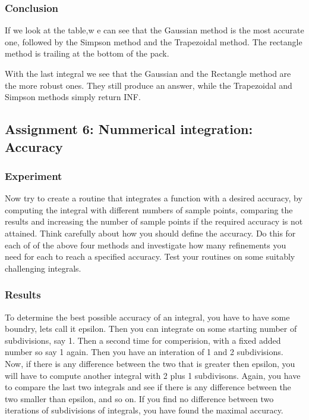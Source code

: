 \documentclass[a4paper,10pt]{article}
\begin{document}
  \subsubsection{Conclusion}
  If we look at the table,w e can see that the Gaussian method is the most accurate one, followed by the Simpson method and the Trapezoidal method. The rectangle method is trailing at the bottom of the pack.

  With the last integral we see that the Gaussian and the Rectangle method are the more robust ones. They still produce an answer, while the Trapezoidal and Simpson methods simply return INF.

  \subsection{Assignment 6: Nummerical integration: Accuracy}

  \subsubsection{Experiment}
  Now try to create a routine that integrates a function with a desired
  accuracy, by computing the integral with different numbers of sample
  points, comparing the results and increasing the number of sample points
  if the required accuracy is not attained. Think carefully about how
  you should define the accuracy. Do this for each of of the above four
  methods and investigate how many refinements you need for each to reach
  a specified accuracy. Test your routines on some suitably challenging integrals.

  \subsubsection{Results}
  To determine the best possible accuracy of an integral, you have to
  have some boundry, lets call it epsilon. Then you can integrate on
  some starting number of subdivisions, say 1. Then a second time for
  comperision, with a fixed added number so say 1 again. Then you have
  an interation of 1 and 2 subdivisions. Now, if there is any difference
  between the two that is greater then epsilon, you will have to compute
  another integral with 2 plus 1 subdivisons. Again, you have to compare
  the last two integrals and see if there is any difference between the
  two smaller than epsilon, and so on. If you find no difference between
  two iterations of subdivisions of integrals, you have found the
  maximal accuracy.\\
\end{document}
